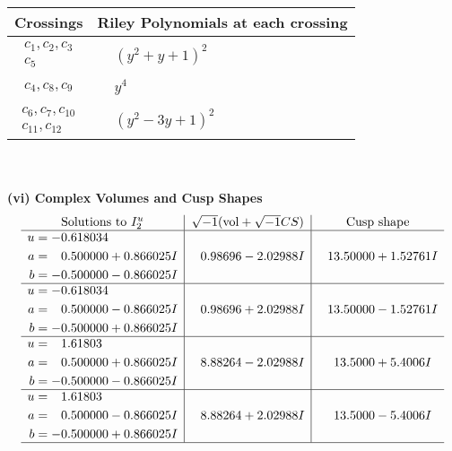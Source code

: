 \documentclass[1p]{elsarticle_modified}
\theoremstyle{definition}
\newcommand{\I}{\sqrt{-1}}
\begin{document}
\begin{tabular}{m{50pt}|m{274pt}}
Crossings & \hspace{64pt}Riley Polynomials at each crossing \\
\hline $$\begin{aligned}c_{1},c_{2},c_{3}\\c_{5}\end{aligned}$$&$\begin{aligned}
&(y^2+y+1)^2
\end{aligned}$\\
\hline $$\begin{aligned}c_{4},c_{8},c_{9}\end{aligned}$$&$\begin{aligned}
&y^4
\end{aligned}$\\
\hline $$\begin{aligned}c_{6},c_{7},c_{10}\\c_{11},c_{12}\end{aligned}$$&$\begin{aligned}
&(y^2-3 y+1)^2
\end{aligned}$\\
\hline
\end{tabular}\\~\\
\newpage\flushleft \textbf{(vi) Complex Volumes and Cusp Shapes}
$$\begin{array}{c|c|c}  
\text{Solutions to }I^u_{2}& \I (\text{vol} + \sqrt{-1}CS) & \text{Cusp shape}\\
 \hline 
\begin{aligned}
u &= -0.618034\phantom{ +0.000000I} \\
a &= \phantom{-}0.500000 + 0.866025 I \\
b &= -0.500000 - 0.866025 I\end{aligned}
 & \phantom{-}0.98696 - 2.02988 I & \phantom{-}13.50000 + 1.52761 I \\ \hline\begin{aligned}
u &= -0.618034\phantom{ +0.000000I} \\
a &= \phantom{-}0.500000 - 0.866025 I \\
b &= -0.500000 + 0.866025 I\end{aligned}
 & \phantom{-}0.98696 + 2.02988 I & \phantom{-}13.50000 - 1.52761 I \\ \hline\begin{aligned}
u &= \phantom{-}1.61803\phantom{ +0.000000I} \\
a &= \phantom{-}0.500000 + 0.866025 I \\
b &= -0.500000 - 0.866025 I\end{aligned}
 & \phantom{-}8.88264 - 2.02988 I & \phantom{-}13.5000 + 5.4006 I \\ \hline\begin{aligned}
u &= \phantom{-}1.61803\phantom{ +0.000000I} \\
a &= \phantom{-}0.500000 - 0.866025 I \\
b &= -0.500000 + 0.866025 I\end{aligned}
 & \phantom{-}8.88264 + 2.02988 I & \phantom{-}13.5000 - 5.4006 I\\
 \hline 
 \end{array}$$\newpage
\end{document}
